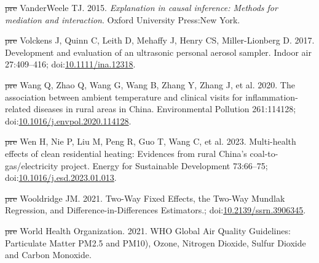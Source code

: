 \documentclass[
  letterpaper,
  DIV=11,
  numbers=noendperiod]{scrartcl}
\newlength{\cslhangindent}
\newenvironment{CSLReferences}[2] %
 {\begin{list}{}{%
  \setlength{\itemindent}{0pt} %
  \setlength{\leftmargin}{0pt} %
  \setlength{\parsep}{0pt} %
  \ifodd #1
   \setlength{\leftmargin}{\cslhangindent} %
   \setlength{\itemindent}{-1\cslhangindent} %
  \fi
  \setlength{\itemsep}{#2\baselineskip}}} %
 {\end{list}} %
\providecommand{\DIFdeltex}[1]{{\protect\color{red}\sout{#1}}}                      %
\providecommand{\DIFaddbegin}{} %
\providecommand{\DIFaddend}{} %
\providecommand{\DIFdelbegin}{} %
\providecommand{\DIFdelend}{} %
\providecommand{\DIFdel}[1]{\texorpdfstring{\DIFdeltex{#1}}{}} %
\newcommand{\DIFscaledelfig}{0.5}
\newlength{\DIFdelgraphicswidth} %
\newlength{\DIFdelgraphicsheight} %
\newcommand{\DIFaddincludegraphics}[2][]{{\color{blue}\fbox{\DIFOincludegraphics[#1]{#2}}}} %
\newcommand{\DIFdelincludegraphics}[2][]{%
\sbox{\DIFdelgraphicsbox}{\DIFOincludegraphics[#1]{#2}}%
\settoboxwidth{\DIFdelgraphicswidth}{\DIFdelgraphicsbox} %
\settoboxtotalheight{\DIFdelgraphicsheight}{\DIFdelgraphicsbox} %
\scalebox{\DIFscaledelfig}{%
\parbox[b]{\DIFdelgraphicswidth}{\usebox{\DIFdelgraphicsbox}\\[-\baselineskip] \rule{\DIFdelgraphicswidth}{0em}}\llap{\resizebox{\DIFdelgraphicswidth}{\DIFdelgraphicsheight}{%
\setlength{\unitlength}{\DIFdelgraphicswidth}%
\begin{picture}(1,1)%
\thicklines\linethickness{2pt} %
{\color[rgb]{1,0,0}\put(0,0){\framebox(1,1){}}}%
{\color[rgb]{1,0,0}\put(0,0){\line( 1,1){1}}}%
{\color[rgb]{1,0,0}\put(0,1){\line(1,-1){1}}}%
\end{picture}%
}\hspace*{3pt}}} %
} %
\DeclareRobustCommand{\DIFaddbegin}{\DIFOaddbegin \let\includegraphics\DIFaddincludegraphics} %
\DeclareRobustCommand{\DIFaddend}{\DIFOaddend \let\includegraphics\DIFOincludegraphics} %
\DeclareRobustCommand{\DIFdelbegin}{\DIFOdelbegin \let\includegraphics\DIFdelincludegraphics} %
\DeclareRobustCommand{\DIFdelend}{\DIFOaddend \let\includegraphics\DIFOincludegraphics} %
\begin{document}
\begin{CSLReferences}{1}{1}
\DIFdelbegin %
\DIFdel{pre}%
\DIFdelend \DIFaddbegin {}
\DIFaddend VanderWeele TJ. 2015. \emph{Explanation in causal inference: Methods for
mediation and interaction}. Oxford University Press:New York.

\DIFdelbegin %
\DIFdel{pre}%
\DIFdelend \DIFaddbegin {}
\DIFaddend Volckens J, Quinn C, Leith D, Mehaffy J, Henry CS, Miller-Lionberg D.
2017. Development and evaluation of an ultrasonic personal aerosol
sampler. Indoor air 27:409--416;
doi:\href{https://doi.org/10.1111/ina.12318}{10.1111/ina.12318}.

\DIFdelbegin %
\DIFdel{pre}%
\DIFdelend \DIFaddbegin {}
\DIFaddend Wang Q, Zhao Q, Wang G, Wang B, Zhang Y, Zhang J, et al. 2020. The
association between ambient temperature and clinical visits for
inflammation-related diseases in rural areas in {China}. Environmental
Pollution 261:114128;
doi:\href{https://doi.org/10.1016/j.envpol.2020.114128}{10.1016/j.envpol.2020.114128}.

\DIFdelbegin %
\DIFdel{pre}%
\DIFdelend \DIFaddbegin {}
\DIFaddend Wen H, Nie P, Liu M, Peng R, Guo T, Wang C, et al. 2023. Multi-health
effects of clean residential heating: {Evidences} from rural {China}'s
coal-to-gas/electricity project. Energy for Sustainable Development
73:66--75;
doi:\href{https://doi.org/10.1016/j.esd.2023.01.013}{10.1016/j.esd.2023.01.013}.

\DIFdelbegin %
\DIFdel{pre}%
\DIFdelend \DIFaddbegin {}
\DIFaddend Wooldridge JM. 2021. Two-{Way Fixed Effects}, the {Two-Way Mundlak
Regression}, and {Difference-in-Differences Estimators}.;
doi:\href{https://doi.org/10.2139/ssrn.3906345}{10.2139/ssrn.3906345}.

\DIFdelbegin %
\DIFdel{pre}%
\DIFdelend \DIFaddbegin {}
\DIFaddend World Health Organization. 2021. {WHO Global Air Quality Guidelines}:
{Particulate Matter PM2}.5 and {PM10}), {Ozone}, {Nitrogen Dioxide},
{Sulfur Dioxide} and {Carbon Monoxide}.


\end{CSLReferences}
\end{document}
